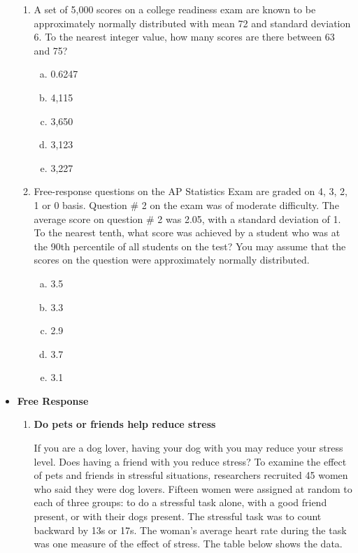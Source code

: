 \documentclass[a4paper,12pt,twoside]{book}
\begin{document}
\begin{itemize}
\begin{enumerate}
  \item A set of 5,000 scores on a college readiness exam are known to be approximately normally distributed with mean 72 and standard deviation 6. To the nearest integer value, how many scores are there between 63 and 75?
      \begin{enumerate}[(a)]
          \item 0.6247
          \item 4,115
          \item 3,650
          \item 3,123
          \item 3,227
      \end{enumerate}
      \vspace{0.3cm}
       
    \item Free-response questions on the AP Statistics Exam are graded on 4, 3, 2, 1 or 0 basis. Question \# 2 on the exam was of moderate difficulty. The average score on question \# 2 was 2.05, with a standard deviation of 1. To the nearest tenth, what score was achieved by a student who was at the 90th percentile of all students on the test? You may assume that the scores on the question were approximately normally distributed.
    
        \begin{enumerate}[(a)]
            \item 3.5
            \item 3.3
            \item 2.9
            \item 3.7
            \item 3.1
        \end{enumerate}                 
 \end{enumerate}
 \newpage
 
 \item {\large{\textbf{Free Response}}}
 
 \begin{enumerate}
     \item \textbf{Do pets or friends help reduce stress}
     
     If you are a dog lover, having your dog with you may reduce your stress level. Does having a friend with you reduce stress? To examine the effect of pets and friends in stressful situations, researchers recruited 45 women who said they were dog lovers. Fifteen women were assigned at random to each of three groups: to do a stressful task alone, with a good friend present, or with their dogs present. The stressful task was to count backward by 13s or 17s. The woman’s average heart rate during the task was one measure of the effect of stress. The table below shows the data.
    

\end{enumerate}
\end{itemize}
\end{document}
